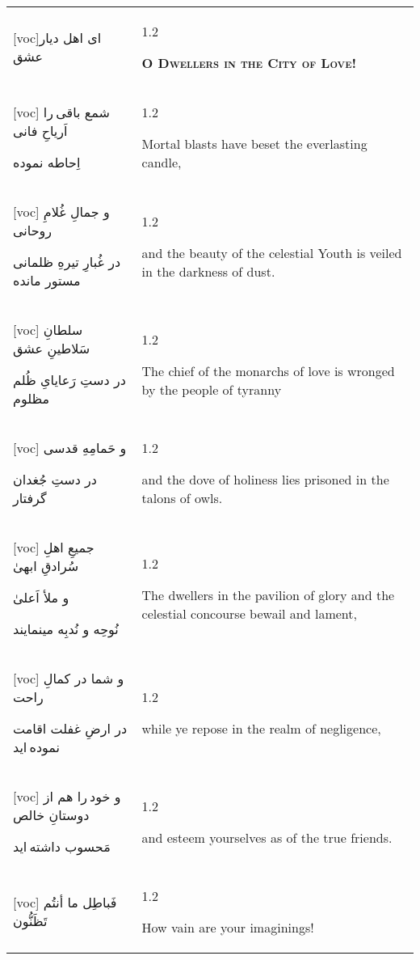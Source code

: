 \documentclass[11pt]{article}
\makeatletter
\newenvironment{orig}
  {\begin{farsi}[voc]}
  {\end{farsi}}
\newenvironment{trans}
  {\Large\begin{spacing}{1.2}\raggedright}
  {\end{spacing}}
\newenvironment{word}
  {\begin{tabular}[t]{p{2.75in}@{\hspace{3em}}p{2.75in}}}
  {\end{tabular}}
\newcommand{\ayat}[2]{\begin{orig}#1\end{orig} & \begin{trans}#2\end{trans}}
\newcommand{\heading}[2]{\textsc{\textbf{#1}} %
}
\makeatother
\begin{document}
\begin{word}
\ayat{ای اهل ديار عشق}{\heading{O Dwellers in the City of Love!}{}} \vspace{-1ex}\\ \ayat{
شمع باقی را اَرياحِ فانی

اِحاطه نموده
}{Mortal blasts have beset the everlasting candle,} \vspace{-1ex}\\ \ayat{
و جمالِ غُلامِ روحانی

در غُبارِ تيرهِ ظلمانی مستور مانده
}{and the beauty of the celestial Youth is veiled in the darkness of
  dust.} \vspace{-1ex}\\ \ayat{
سلطانِ سَلاطينِ عشق

در دستِ رَعايایِ ظُلم مظلوم
}{The chief of the monarchs of love is wronged by the people of
  tyranny} \vspace{-1ex}\\ \ayat{
و حَمامِهِ قدسی

در دستِ جُغدان گرفتار
}{and the dove of holiness lies prisoned in the talons of owls.} \vspace{-1ex}\\ \ayat{
جميعِ اهلِ سُرادقِ ابهیٰ

و ملأ اَعلیٰ

نُوحِه و نُدبِه مينمايند
}{The dwellers in the pavilion of glory and the celestial concourse bewail and
  lament,} \\ \ayat{
و شما در کمالِ راحت

در ارضِ غفلت اقامت نموده ايد
}{while ye repose in the realm of negligence,} \vspace{-1ex}\\ \ayat{
و خود را هم از دوستانِ خالص

مَحسوب داشته ايد
}{and esteem yourselves as of the true friends.} \vspace{-1ex}\\ \ayat{
فَباطِل ما أنتُم تَظَنُّون
}{How vain are your imaginings!}
\end{word}

\pagebreak
\end{document}
